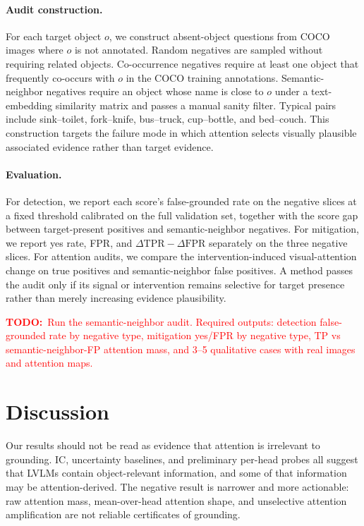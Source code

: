 \documentclass[letterpaper]{article} \usepackage[submission]{aaai2027}  \usepackage[hyphens]{url}  \usepackage{graphicx} \urlstyle{rm} \def\UrlFont{\rm}  \usepackage{natbib}  \usepackage{caption} \frenchspacing
\newcommand{\TODO}[1]{\textcolor{red}{\textbf{TODO:}~#1}}
\begin{document}
\paragraph{Audit construction.}
For each target object $o$, we construct absent-object questions from COCO images where $o$ is not annotated. Random negatives are sampled without requiring related objects. Co-occurrence negatives require at least one object that frequently co-occurs with $o$ in the COCO training annotations. Semantic-neighbor negatives require an object whose name is close to $o$ under a text-embedding similarity matrix and passes a manual sanity filter. Typical pairs include sink--toilet, fork--knife, bus--truck, cup--bottle, and bed--couch. This construction targets the failure mode in which attention selects visually plausible associated evidence rather than target evidence.

\paragraph{Evaluation.}
For detection, we report each score's false-grounded rate on the negative slices at a fixed threshold calibrated on the full validation set, together with the score gap between target-present positives and semantic-neighbor negatives. For mitigation, we report yes rate, FPR, and $\Delta\mathrm{TPR}-\Delta\mathrm{FPR}$ separately on the three negative slices. For attention audits, we compare the intervention-induced visual-attention change on true positives and semantic-neighbor false positives. A method passes the audit only if its signal or intervention remains selective for target presence rather than merely increasing evidence plausibility.

\TODO{Run the semantic-neighbor audit. Required outputs: detection false-grounded rate by negative type, mitigation yes/FPR by negative type, TP vs semantic-neighbor-FP attention mass, and 3--5 qualitative cases with real images and attention maps.}
 \section{Discussion}
\label{sec:discussion}

\noindent Our results should not be read as evidence that attention is irrelevant to grounding. IC, uncertainty baselines, and preliminary per-head probes all suggest that LVLMs contain object-relevant information, and some of that information may be attention-derived. The negative result is narrower and more actionable: raw attention mass, mean-over-head attention shape, and unselective attention amplification are not reliable certificates of grounding.
\end{document}

